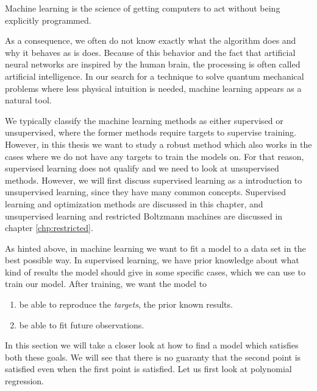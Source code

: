 \begin{shadequote}{}
	Machine learning is the science of getting computers to act without being explicitly programmed.
\end{shadequote}

As a consequence, we often do not know exactly what the algorithm does and why it behaves as is does. Because of this behavior and the fact that artificial neural networks are inspired by the human brain, the processing is often called artificial intelligence. In our search for a technique to solve quantum mechanical problems where less physical intuition is needed, machine learning appears as a natural tool.

We typically classify the machine learning methods as either supervised or unsupervised, where the former methods require targets to supervise training. However, in this thesis we want to study a robust method which also works in the cases where we do not have any targets to train the models on. For that reason, supervised learning does not qualify and we need to look at unsupervised methods. However, we will first discuss supervised learning as a introduction to unsupervised learning, since they have many common concepts. Supervised learning and optimization methods are discussed in this chapter, and unsupervised learning and restricted Boltzmann machines are discussed in chapter \ref{chp:restricted}.

As hinted above, in machine learning we want to fit a model to a data set in the best possible way. In supervised learning, we have prior knowledge about what kind of results the model should give in some specific cases, which we can use to train our model. After training, we want the model to
\begin{enumerate}
	\item be able to reproduce the \textit{targets}, the prior known results.
	\item be able to fit future observations.
\end{enumerate}
In this section we will take a closer look at how to find a model which satisfies both these goals. We will see that there is no guaranty that the second point is satisfied even when the first point is satisfied. Let us first look at polynomial regression. 

